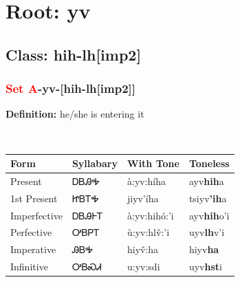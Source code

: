 \needspace{4in}
\section*{Root: yv}
\nopagebreak
{}
\needspace{3in}
\subsection*{Class: hih-lh[imp2]}
\nopagebreak
\needspace{2in}
\subsubsection*{\textcolor{Red}{Set A}{-}\textbf{yv}{-}[hih-lh[imp2]]}
\nopagebreak
\textbf{Definition: } he/she is entering it
\\[0.5em]
\begin{tabularx}{\textwidth}{l X X X}%
\toprule%
\textbf{Form}&\textbf{Syllabary}&\textbf{With Tone}&\textbf{Toneless}\\%
\midrule%
Present&ᎠᏴᎯᎭ&à:yv:híha&ayv\textbf{hih}a\\%
1st Present&ᏥᏴᎢᎭ&jiyv’íha&tsiyv\textbf{'ih}a\\%
Imperfective&ᎠᏴᎯᎰᎢ&à:yv:hihó:’i&ayv\textbf{hih}o'i\\%
Perfective&ᎤᏴᏢᎢ&ù:yv:hlv̌:’i&uyv\textbf{lh}v'i\\%
Imperative&ᎯᏴᎭ&hiyv̌:ha&hiyv\textbf{ha}\\%
Infinitive&ᎤᏴᏍᏗ&u:yv:sdi&uyv\textbf{hst}i\\%
\bottomrule%
\end{tabularx}
\\[1em]